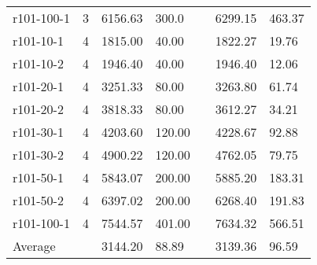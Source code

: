 \documentclass[final,5p,times,twocolumn]{elsarticle}
\begin{document}
{{{{\begin{table}[htbp]
\begin{tabular}{l l l l l l l}
r101-100-1&3&6156.63&300.0&&6299.15&463.37\\
r101-10-1&4&1815.00&40.00&&1822.27&19.76\\
r101-10-2&4&1946.40&40.00&&1946.40&12.06\\
r101-20-1&4&3251.33&80.00&&3263.80&61.74\\
r101-20-2&4&3818.33&80.00&&3612.27&34.21\\
r101-30-1&4&4203.60&120.00&&4228.67&92.88\\
r101-30-2&4&4900.22&120.00&&4762.05&79.75\\
r101-50-1&4&5843.07&200.00&&5885.20&183.31\\
r101-50-2&4&6397.02&200.00&&6268.40&191.83\\
r101-100-1&4&7544.57&401.00&&7634.32&566.51\\
\hline
Average&&3144.20&88.89&&3139.36&96.59\\
\hline
\end{tabular}
\label{tab:pt100_5}
\end{table}

}}}}
\end{document}

